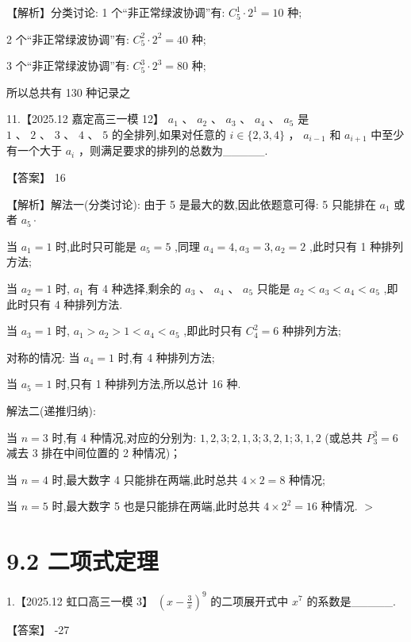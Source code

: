 \documentclass[10pt]{article}
\begin{document}
【解析】分类讨论: 1 个“非正常绿波协调”有: \({C}_{5}^{1} \cdot  {2}^{1} = {10}\) 种;

2 个“非正常绿波协调”有: \({C}_{5}^{2} \cdot  {2}^{2} = {40}\) 种;

3 个“非正常绿波协调”有: \({C}_{5}^{3} \cdot  {2}^{3} = {80}\) 种;

所以总共有 130 种记录之

11.【2025.12 嘉定高三一模 12】 \({a}_{1}\text{ 、 }{a}_{2}\text{ 、 }{a}_{3}\text{ 、 }{a}_{4}\text{ 、 }{a}_{5}\) 是 \(1\text{ 、 }2\text{ 、 }3\text{ 、 }4\text{ 、 }5\) 的全排列,如果对任意的 \(i \in  \{ 2,3,4\}\) ， \({a}_{i - 1}\) 和 \({a}_{i + 1}\) 中至少有一个大于 \({a}_{i}\) ，则满足要求的排列的总数为\_\_\_\_\_.

【答案】 16

【解析】解法一(分类讨论): 由于 5 是最大的数,因此依题意可得: 5 只能排在 \({a}_{1}\) 或者 \({a}_{5} \cdot\)

当 \({a}_{1} = 1\) 时,此时只可能是 \({a}_{5} = 5\) ,同理 \({a}_{4} = 4,{a}_{3} = 3,{a}_{2} = 2\) ,此时只有 1 种排列方法;

当 \({a}_{2} = 1\) 时, \({a}_{1}\) 有 4 种选择,剩余的 \({a}_{3}\text{ 、 }{a}_{4}\text{ 、 }{a}_{5}\) 只能是 \({a}_{2} < {a}_{3} < {a}_{4} < {a}_{5}\) ,即此时只有 4 种排列方法.

当 \({a}_{3} = 1\) 时, \({a}_{1} > {a}_{2} > 1 < {a}_{4} < {a}_{5}\) ,即此时只有 \({C}_{4}^{2} = 6\) 种排列方法;

对称的情况: 当 \({a}_{4} = 1\) 时,有 4 种排列方法;

当 \({a}_{5} = 1\) 时,只有 1 种排列方法,所以总计 16 种.

解法二(递推归纳):

当 \(n = 3\) 时,有 4 种情况,对应的分别为: \(1,2,3;2,1,3;3,2,1;3,1,2\) (或总共 \({P}_{3}^{3} = 6\) 减去 3 排在中间位置的 2 种情况)；

当 \(n = 4\) 时,最大数字 4 只能排在两端,此时总共 \(4 \times  2 = 8\) 种情况;

当 \(n = 5\) 时,最大数字 5 也是只能排在两端,此时总共 \(4 \times  {2}^{2} = {16}\) 种情况. \(>\)

\section*{9.2 二项式定理}

1.【2025.12 虹口高三一模 3】 \({\left( x - \frac{3}{x}\right) }^{9}\) 的二项展开式中 \({x}^{7}\) 的系数是\_\_\_\_\_.

【答案】 -27
\end{document}
